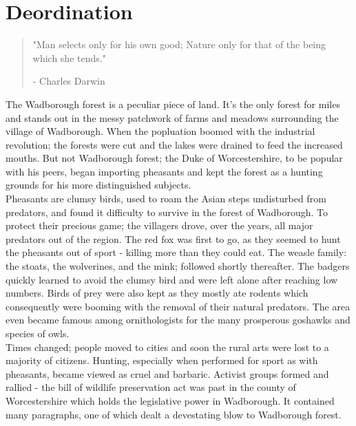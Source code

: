 
\chapter{Deordination}
\vspace{-1.3cm}
\begin{localsize}{10}
	\begin{quote}
		"Man selects only for his own good; Nature only for that of the being which she tends."
		\begin{flushright}- Charles Darwin\end{flushright}
	\end{quote} 
\end{localsize}
\vspace{1cm}

The Wadborough forest is a peculiar piece of land. It's the only forest for miles and stands out in the messy patchwork of farms and meadows surrounding the village of Wadborough. When the popluation boomed with the industrial revolution; the forests were cut and the lakes were drained to feed the increased mouths. But not Wadborough forest; the Duke of Worcestershire, to be popular with his peers, began importing pheasants and kept the forest as a hunting grounds for his more distinguished subjects.\\
 
Pheasants are clumsy birds, used to roam the Asian steps undisturbed from predators, and found it difficulty to survive in the forest of Wadborough. To protect their precious game; the villagers drove, over the years, all major predators out of the region. The red fox was first to go, as they seemed to hunt the pheasants out of sport - killing more than they could eat. The weasle family: the stoats, the wolverines, and the mink; followed shortly thereafter. The badgers quickly learned to avoid the clumsy bird and were left alone after reaching low numbers. Birds of prey were also kept as they mostly ate rodents which consequently were booming with the removal of their natural predators. The area even became famous among ornithologists for the many prosperous goshawks and species of owls.\\

Times changed; people moved to cities and soon the rural arts were lost to a majority of citizens. Hunting, especially when performed for sport as with pheasants, became viewed as cruel and barbaric. Activist groups formed and rallied - the bill of wildlife preservation act was past in the county of Worcestershire which holds the legislative power in Wadborough. It contained many paragraphs, one of which dealt a devestating blow to Wadborough forest.

